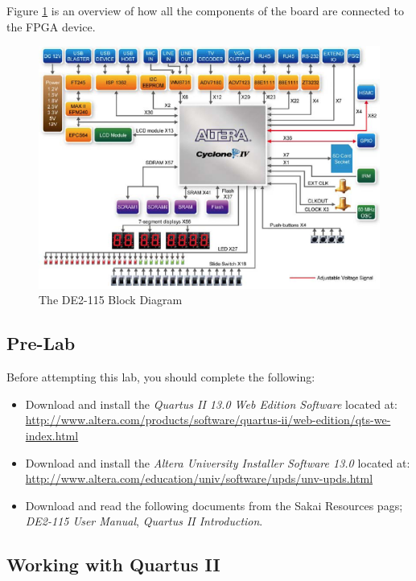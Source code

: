 Figure \ref{fig:DE2Block} is an overview of how all the components of the board are connected to the FPGA device.

\begin{figure}[H]
	\centering
	\includegraphics[width=170mm]{Lab1/figures/DE2-115Block.png}
	\caption{The DE2-115 Block Diagram}
	\label{fig:DE2Block}
\end{figure}

\subsection{Pre-Lab}

Before attempting this lab, you should complete the following:

\begin{itemize}
	\item Download and install the \emph{Quartus II 13.0 Web Edition Software} located at:
	 \\ \url{http://www.altera.com/products/software/quartus-ii/web-edition/qts-we-index.html}

	\item Download and install the \emph{Altera University Installer Software 13.0} located at:
	 \\ \url{http://www.altera.com/education/univ/software/upds/unv-upds.html}

	\item Download and read the following documents from the Sakai Resources pags;  \emph{DE2-115 User Manual}, \emph{Quartus II Introduction}.
\end{itemize}
 
\subsection{Working with Quartus II}

